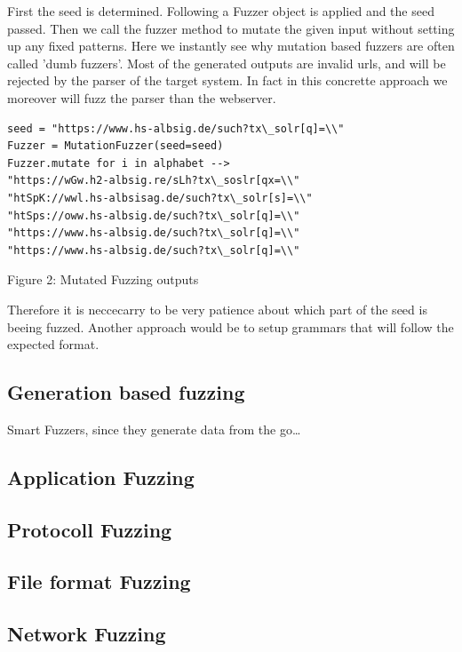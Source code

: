 \documentclass[journal=tosc,final]{iacrtrans}
\begin{document}
First the seed is determined. Following a Fuzzer object is applied and the seed passed. Then we call the fuzzer method to mutate the given input without setting up any fixed patterns. Here we instantly see why mutation based fuzzers are often called 'dumb fuzzers'. 
Most of the generated outputs are invalid urls, and will be rejected by the parser of the target system. In fact in this concrette approach we moreover will fuzz the parser than the webserver.
\newpage
\begin{center}
\begin{shaded}
\begin{verbatim}
seed = "https://www.hs-albsig.de/such?tx\_solr[q]=\\"
Fuzzer = MutationFuzzer(seed=seed)
Fuzzer.mutate for i in alphabet -->
"https://wGw.h2-albsig.re/sLh?tx\_soslr[qx=\\"
"htSpK://wwl.hs-albsisag.de/such?tx\_solr[s]=\\"
"htSps://oww.hs-albsig.de/such?tx\_solr[q]=\\"
"https://www.hs-albsig.de/such?tx\_solr[q]=\\"
"https://www.hs-albsig.de/such?tx\_solr[q]=\\"
\end{verbatim}
\vspace{2mm} Figure 2: Mutated Fuzzing outputs
\end{shaded}
\end{center}
Therefore it is neccecarry to be very patience about which part of the seed is beeing fuzzed. Another approach would be to setup grammars that will follow the expected format.
\newpage
\subsection{Generation based fuzzing}
Smart Fuzzers, since they generate data from the go\dots
\newpage
\subsection{Application Fuzzing}

\subsection{Protocoll Fuzzing}
\subsection{File format Fuzzing}
\subsection{Network Fuzzing}
\newpage
\end{document}
